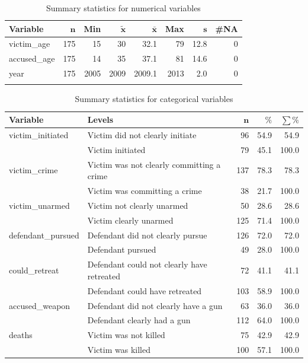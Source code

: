 \documentclass[12pt,article]{article}
\begin{document}
{\footnotesize
\begin{longtable}{lrrrrrrr}
\caption{Summary statistics for numerical variables} \\
 \textbf{Variable} & $\mathbf{n}$ & \textbf{Min} & $\mathbf{\widetilde{x}}$ & $\mathbf{\bar{x}}$ & \textbf{Max} & $\mathbf{s}$ & \textbf{\#NA} \\ 
  \hline
  victim\_age & 175 &   15 &   30 &   32.1 &   79 & 12.8 & 0 \\ 
  accused\_age & 175 &   14 &   35 &   37.1 &   81 & 14.6 & 0 \\ 
  year & 175 & 2005 & 2009 & 2009.1 & 2013 &  2.0 & 0 \\ \hline
\label{Summary statistics for numerical variables}
\end{longtable}
}
{\footnotesize
\begin{longtable}{ll|rrr}
\caption{Summary statistics for categorical variables} \\ 
 \textbf{Variable} & \textbf{Levels} & $\mathbf{n}$ & $\mathbf{\%}$ & $\mathbf{\sum \%}$ \\ 
  \hline
victim\_initiated & Victim did not clearly initiate & 96 & 54.9 & 54.9 \\ 
   & Victim initiated & 79 & 45.1 & 100.0 \\ 
\hline
victim\_crime & Victim was not clearly committing a crime & 137 & 78.3 & 78.3 \\ 
   & Victim was committing a crime & 38 & 21.7 & 100.0 \\ 
\hline
victim\_unarmed & Victim not clearly unarmed & 50 & 28.6 & 28.6 \\ 
   & Victim clearly unarmed & 125 & 71.4 & 100.0 \\ 
\hline
defendant\_pursued & Defendant did not clearly pursue & 126 & 72.0 & 72.0 \\ 
   & Defendant pursued & 49 & 28.0 & 100.0 \\ 
\hline
could\_retreat & Defendant could not clearly have retreated & 72 & 41.1 & 41.1 \\ 
   & Defendant could have retreated & 103 & 58.9 & 100.0 \\ 
\hline
accused\_weapon & Defendant did not clearly have a gun & 63 & 36.0 & 36.0 \\ 
   & Defendant clearly had a gun & 112 & 64.0 & 100.0 \\ 
\hline
deaths & Victim was not killed & 75 & 42.9 & 42.9 \\ 
   & Victim was killed & 100 & 57.1 & 100.0 \\ 

\end{longtable}}
\end{document}
